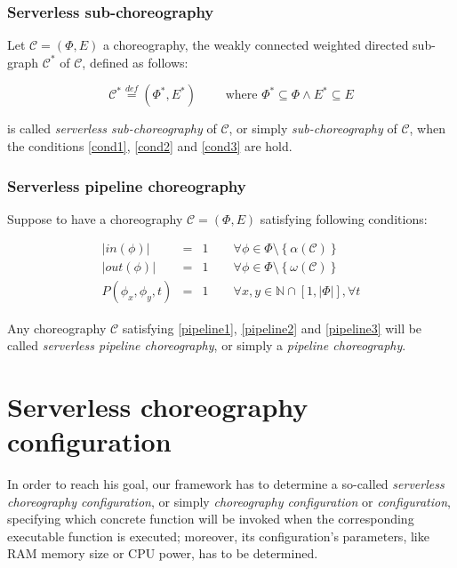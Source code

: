 \documentclass[12pt,a4paper]{report}
\newcommand{\mathDef}{\overset{\textit{def}}{=}}
\newcommand{\N}{\mathbb{N}}
\newcommand{\SetFromOneTo}[1]{\N \cap \left[1,#1\right]}
\begin{document}
\subsubsection{Serverless sub-choreography}

Let $\mathcal{C} = (\Phi,E)$ a choreography, the weakly connected weighted directed sub-graph $\mathcal{C}^*$ of $\mathcal{C}$, defined as follows:

\begin{equation}
	\mathcal{C}^* \mathDef (\Phi^*,E^*) \qquad \text{ where } \Phi^* \subseteq \Phi \wedge E^* \subseteq E
\end{equation}

is called \textit{serverless sub-choreography} of $\mathcal{C}$, or simply \textit{sub-choreography} of $\mathcal{C}$, when the conditions \ref{cond1}, \ref{cond2} and \ref{cond3} are hold.

\subsubsection{Serverless pipeline choreography}\label{PipelineDefinitionSection}

Suppose to have a choreography $\mathcal{C} = (\Phi,E)$ satisfying following conditions:

\begin{eqnarray}
	|in(\phi)| & = & 1 \qquad \forall \phi \in \Phi \setminus \left\{ \alpha(\mathcal{C}) \right\} \label{pipeline1} \\
	|out(\phi)| & = & 1 \qquad \forall \phi \in \Phi \setminus \left\{ \omega(\mathcal{C}) \right\} \label{pipeline2} \\
	P(\phi_x, \phi_y, t) & = & 1 \qquad \forall x,y \in \SetFromOneTo{|\Phi|}, \forall t \label{pipeline3}
\end{eqnarray}

Any choreography $\mathcal{C}$ satisfying \ref{pipeline1}, \ref{pipeline2} and \ref{pipeline3} will be called \textit{serverless pipeline choreography}, or simply a \textit{pipeline choreography}.

\section{Serverless choreography configuration}

In order to reach his goal, our framework has to determine a so-called \textit{serverless choreography configuration}, or simply \textit{choreography configuration} or \textit{configuration}, specifying which concrete function will be invoked when the corresponding executable function is executed; moreover, its configuration's parameters, like RAM memory size or CPU power, has to be determined.
\end{document}
